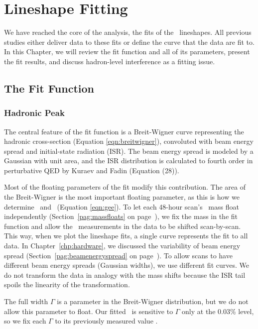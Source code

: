 \documentclass{cornell}
\begin{document}
\chapter{Lineshape Fitting}
\label{chp:fitting}

We have reached the core of the analysis, the fits of the \ups\
lineshapes.  All previous studies either deliver data to these fits or
define the curve that the data are fit to.  In this Chapter, we will
review the fit function and all of its parameters, present the fit
results, and discuss hadron-level interference as a fitting issue.

\section{The Fit Function}
\label{sec:fitfunction}

\subsection{Hadronic Peak}

The central feature of the fit function is a Breit-Wigner curve
representing the hadronic cross-section (Equation
\ref{eqn:breitwigner}), convoluted with beam energy spread and
initial-state radiation (ISR).  The beam energy spread is modeled by a
Gaussian with unit area, and the ISR distribution is calculated to
fourth order in perturbative QED by Kuraev and Fadin \cite{kf}
(Equation (28)).

Most of the floating parameters of the fit modify this contribution.
The area of the Breit-Wigner is the most important floating parameter,
as this is how we determine \geehadtot\ and \gee\ (Equation
\ref{eqn:gee}).  To let each 48-hour scan's \ups\ mass float
independently (Section~\ref{pag:massfloats} on
page~\pageref{pag:massfloats}), we fix the mass in the fit function
and allow the \ecm\ measurements in the data to be shifted
scan-by-scan.  This way, when we plot the lineshape fits, a single
curve represents the fit to all data.  In Chapter~\ref{chp:hardware},
we discussed the variability of beam energy spread
(Section~\ref{pag:beamenergyspread} on
page~\pageref{pag:beamenergyspread}).  To allow scans to have
different beam energy spreads (Gaussian widths), we use different fit
curves.  We do not transform the data in analogy with the mass shifts
because the ISR tail spoils the linearity of the transformation.

The full width $\Gamma$ is a parameter in the Breit-Wigner
distribution, but we do not allow this parameter to float.  Our fitted
\geehadtot\ is sensitive to $\Gamma$ only at the 0.03\% level, so we
fix each $\Gamma$ to its previously measured value \cite{pdg}.
\end{document}
